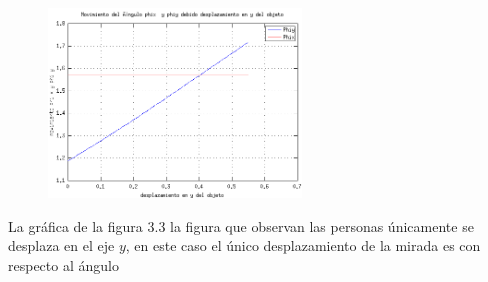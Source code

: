 \documentclass[paper=a4, fontsize=11pt]{scrartcl} %
\numberwithin{equation}{section} %
\numberwithin{figure}{section} %
\numberwithin{table}{section} %
\begin{document}
  \begin{figure}[htbp]
  	\centering
  	\includegraphics[width=0.6\textwidth]{figure2}
  	\caption{}\label{fig: figura}
  \end{figure}
La gráfica de la figura 3.3	la figura que observan las personas únicamente se desplaza en el eje $y$, en este caso el único desplazamiento de la mirada es con respecto al ángulo  
\end{document}
